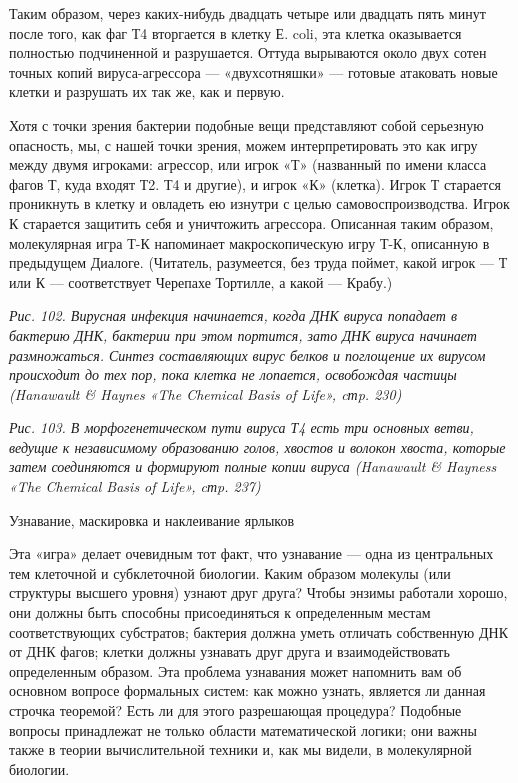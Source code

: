 \documentclass[../main.tex]{subfiles}
\begin{document}
Таким образом, через каких-нибудь двадцать четыре или двадцать пять минут после того, как фаг Т4 вторгается в клетку Е. coli, эта клетка оказывается полностью подчиненной и разрушается. Оттуда вырываются около двух сотен точных копий вируса-агрессора --- «двухсотняшки» --- готовые атаковать новые клетки и разрушать их так же, как и первую.

Хотя с точки зрения бактерии подобные вещи представляют собой серьезную опасность, мы, с нашей точки зрения, можем интерпретировать это как игру между двумя игроками: агрессор, или игрок «Т» (названный по имени класса фагов Т, куда входят Т2. Т4 и другие), и игрок «К» (клетка). Игрок Т старается проникнуть в клетку и овладеть ею изнутри с целью самовоспроизводства. Игрок К старается защитить себя и уничтожить агрессора. Описанная таким образом, молекулярная игра Т-К напоминает макроскопическую игру Т-К, описанную в предыдущем Диалоге. (Читатель, разумеется, без труда поймет, какой игрок --- Т или К --- соответствует Черепахе Тортилле, а какой --- Крабу.)

\emph{Рис. 102. Вирусная инфекция начинается, когда ДНК вируса попадает в бактерию ДНК, бактерии при этом портится, зато ДНК вируса начинает размножаться. Синтез составляющих вирус белков и поглощение их вирусом происходит до тех пор, пока клетка не лопается, освобождая частицы (Hanawault \& Haynes «The Chemical Basis of Life», cтp. 230)}

\emph{Рис. 103. В морфогенетическом пути вируса Т4 есть три основных ветви, ведущие к независимому образованию голов, хвостов и волокон хвоста, которые затем соединяются и формируют полные копии вируса (Hanawault \& Hayness «The Chemical Basis of Life», cтp. 237)}

Узнавание, маскировка и наклеивание ярлыков

Эта «игра» делает очевидным тот факт, что узнавание --- одна из центральных тем клеточной и субклеточной биологии. Каким образом молекулы (или структуры высшего уровня) узнают друг друга? Чтобы энзимы работали хорошо, они должны быть способны присоединяться к определенным местам соответствующих субстратов; бактерия должна уметь отличать собственную ДНК от ДНК фагов; клетки должны узнавать друг друга и взаимодействовать определенным образом. Эта проблема узнавания может напомнить вам об основном вопросе формальных систем: как можно узнать, является ли данная строчка теоремой? Есть ли для этого разрешающая процедура? Подобные вопросы принадлежат не только области математической логики; они важны также в теории вычислительной техники и, как мы видели, в молекулярной биологии.
\end{document}
